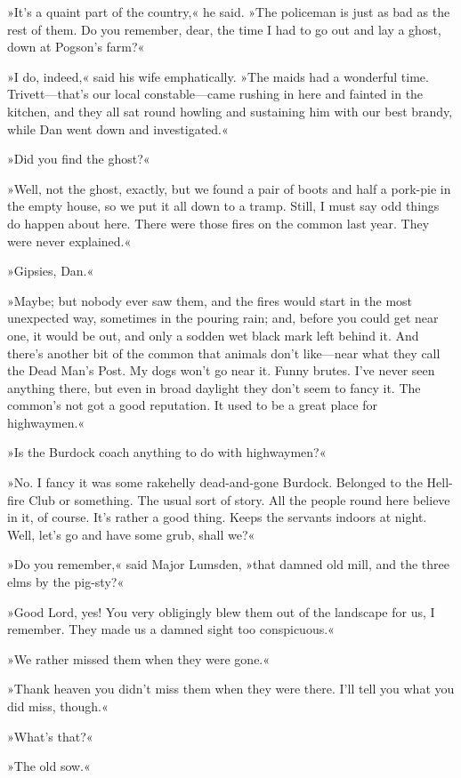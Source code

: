»It's a quaint part of the country,« he said. »The policeman is just as bad as the rest of them. Do you remember, dear, the time I had to go out and lay a ghost, down at Pogson's farm?«

»I do, indeed,« said his wife emphatically. »The maids had a wonderful time. Trivett—that's our local constable—came rushing in here and fainted in the kitchen, and they all sat round howling and sustaining him with our best brandy, while Dan went down and investigated.«

»Did you find the ghost?«

»Well, not the ghost, exactly, but we found a pair of boots and half a pork-pie in the empty house, so we put it all down to a tramp. Still, I must say odd things do happen about here. There were those fires on the common last year. They were never explained.«

»Gipsies, Dan.«

»Maybe; but nobody ever saw them, and the fires would start in the most unexpected way, sometimes in the pouring rain; and, before you could get near one, it would be out, and only a sodden wet black mark left behind it. And there's another bit of the common that animals don't like—near what they call the Dead Man's Post. My dogs won't go near it. Funny brutes. I've never seen anything there, but even in broad daylight they don't seem to fancy it. The common's not got a good reputation. It used to be a great place for highwaymen.«

»Is the Burdock coach anything to do with highwaymen?«

»No. I fancy it was some rakehelly dead-and-gone Burdock. Belonged to the Hell-fire Club or something. The usual sort of story. All the people round here believe in it, of course. It's rather a good thing. Keeps the servants indoors at night. Well, let's go and have some grub, shall we?«

\divider
»Do you remember,« said Major Lumsden, »that damned old mill, and the three elms by the pig-sty?«

»Good Lord, yes! You very obligingly blew them out of the landscape for us, I remember. They made us a damned sight too conspicuous.«

»We rather missed them when they were gone.«

»Thank heaven you didn't miss them when they were there. I'll tell you what you did miss, though.«

»What's that?«

»The old sow.«

